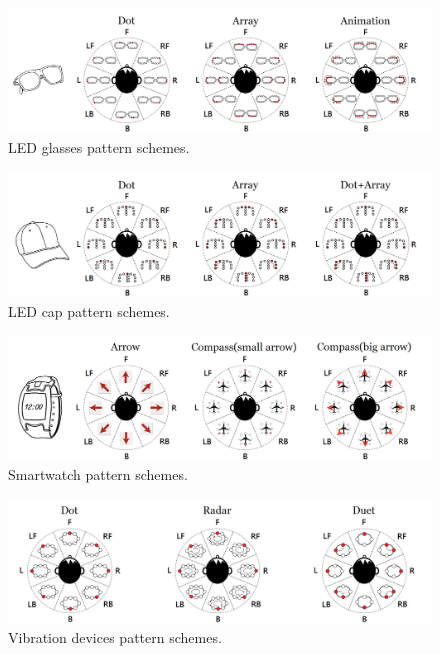 \documentclass{sigchi}
\begin{document}
\begin{figure}[!t]
\centering
\includegraphics[width=2.15\columnwidth]{glasses_pattern_combine}
\caption{LED glasses pattern schemes.}
\label{fig:glasses_scheme}
\end{figure}

\begin{figure}[!t]
\centering
\includegraphics[width=2.15\columnwidth]{hat_pattern_combine}
\caption{LED cap pattern schemes.}
\label{fig:cap_scheme}
\end{figure}

\begin{figure}[!t]
\centering
\includegraphics[width=2.15\columnwidth]{smartwatch_pattern_combine}
\caption{Smartwatch pattern schemes.}
\label{fig:smartwatch_scheme}
\end{figure}

\begin{figure}[!t]
\centering
\includegraphics[width=2.15\columnwidth]{vibration_pattern_combine}
\caption{Vibration devices pattern schemes.}
\label{fig:vibratin_scheme}
\end{figure}
\end{document}

